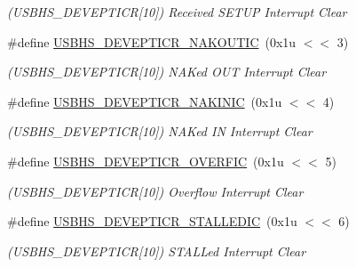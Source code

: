 \begin{DoxyCompactItemize}
\begin{DoxyCompactList}\small\item\em (U\+S\+B\+H\+S\+\_\+\+D\+E\+V\+E\+P\+T\+I\+CR\mbox{[}10\mbox{]}) Received S\+E\+T\+UP Interrupt Clear \end{DoxyCompactList}\item 
\mbox{\label{group__SAMS70__USBHS_ga3659c5fa83d6311cf6972873abab8175}} 
\#define \mbox{\hyperlink{group__SAMS70__USBHS_ga3659c5fa83d6311cf6972873abab8175}{U\+S\+B\+H\+S\+\_\+\+D\+E\+V\+E\+P\+T\+I\+C\+R\+\_\+\+N\+A\+K\+O\+U\+T\+IC}}~(0x1u $<$$<$ 3)
\begin{DoxyCompactList}\small\item\em (U\+S\+B\+H\+S\+\_\+\+D\+E\+V\+E\+P\+T\+I\+CR\mbox{[}10\mbox{]}) N\+A\+Ked O\+UT Interrupt Clear \end{DoxyCompactList}\item 
\mbox{\label{group__SAMS70__USBHS_ga7765091e9bc91c9256e0970fd461c910}} 
\#define \mbox{\hyperlink{group__SAMS70__USBHS_ga7765091e9bc91c9256e0970fd461c910}{U\+S\+B\+H\+S\+\_\+\+D\+E\+V\+E\+P\+T\+I\+C\+R\+\_\+\+N\+A\+K\+I\+N\+IC}}~(0x1u $<$$<$ 4)
\begin{DoxyCompactList}\small\item\em (U\+S\+B\+H\+S\+\_\+\+D\+E\+V\+E\+P\+T\+I\+CR\mbox{[}10\mbox{]}) N\+A\+Ked IN Interrupt Clear \end{DoxyCompactList}\item 
\mbox{\label{group__SAMS70__USBHS_ga86269e7c828e6f56daa4d6d164cba205}} 
\#define \mbox{\hyperlink{group__SAMS70__USBHS_ga86269e7c828e6f56daa4d6d164cba205}{U\+S\+B\+H\+S\+\_\+\+D\+E\+V\+E\+P\+T\+I\+C\+R\+\_\+\+O\+V\+E\+R\+F\+IC}}~(0x1u $<$$<$ 5)
\begin{DoxyCompactList}\small\item\em (U\+S\+B\+H\+S\+\_\+\+D\+E\+V\+E\+P\+T\+I\+CR\mbox{[}10\mbox{]}) Overflow Interrupt Clear \end{DoxyCompactList}\item 
\mbox{\label{group__SAMS70__USBHS_gaa8e26b5bde4aa55a5ccbf652d66eb58c}} 
\#define \mbox{\hyperlink{group__SAMS70__USBHS_gaa8e26b5bde4aa55a5ccbf652d66eb58c}{U\+S\+B\+H\+S\+\_\+\+D\+E\+V\+E\+P\+T\+I\+C\+R\+\_\+\+S\+T\+A\+L\+L\+E\+D\+IC}}~(0x1u $<$$<$ 6)
\begin{DoxyCompactList}\small\item\em (U\+S\+B\+H\+S\+\_\+\+D\+E\+V\+E\+P\+T\+I\+CR\mbox{[}10\mbox{]}) S\+T\+A\+L\+Led Interrupt Clear \end{DoxyCompactList}\item 

\end{DoxyCompactItemize}
